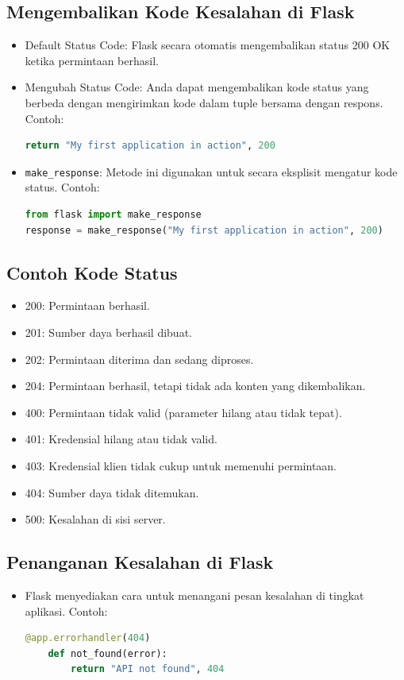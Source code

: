 \documentclass{article}
\begin{document}
\subsection{Mengembalikan Kode Kesalahan di Flask}
\begin{itemize}
    \item Default Status Code: Flask secara otomatis mengembalikan status 200 OK ketika permintaan berhasil.
    \item Mengubah Status Code: Anda dapat mengembalikan kode status yang berbeda dengan mengirimkan kode dalam tuple bersama dengan respons. Contoh:
          \begin{lstlisting}[language=Python, caption={}, captionpos=b]
    return "My first application in action", 200
    \end{lstlisting}
    \item \verb|make_response|: Metode ini digunakan untuk secara eksplisit mengatur kode status. Contoh:
          \begin{lstlisting}[language=Python, caption={}, captionpos=b]
from flask import make_response
response = make_response("My first application in action", 200)
    \end{lstlisting}
\end{itemize}

\subsection{Contoh Kode Status}
\begin{itemize}
    \item 200: Permintaan berhasil.
    \item 201: Sumber daya berhasil dibuat.
    \item 202: Permintaan diterima dan sedang diproses.
    \item 204: Permintaan berhasil, tetapi tidak ada konten yang dikembalikan.
    \item 400: Permintaan tidak valid (parameter hilang atau tidak tepat).
    \item 401: Kredensial hilang atau tidak valid.
    \item 403: Kredensial klien tidak cukup untuk memenuhi permintaan.
    \item 404: Sumber daya tidak ditemukan.
    \item 500: Kesalahan di sisi server.
\end{itemize}

\subsection{Penanganan Kesalahan di Flask}
\begin{itemize}
    \item Flask menyediakan cara untuk menangani pesan kesalahan di tingkat aplikasi. Contoh:
          \begin{lstlisting}[language=Python, caption={}, captionpos=b]
    @app.errorhandler(404)
    def not_found(error):
        return "API not found", 404
\end{lstlisting}
\end{itemize}
\end{document}
